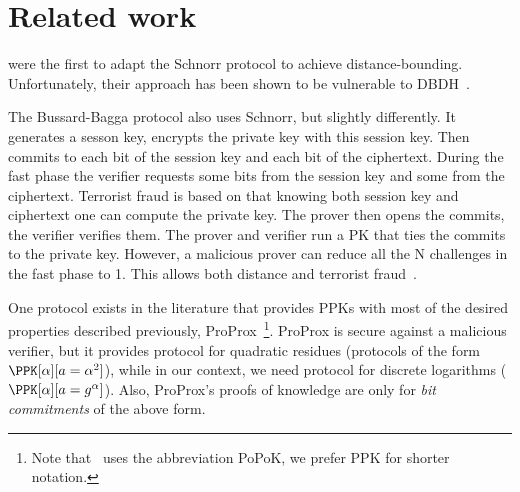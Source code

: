 \section{Related work}%
\label{related-work}

\textcite{DistanceBounding} were the first to adapt the Schnorr
protocol to achieve distance-bounding.
Unfortunately, their approach has been shown to be vulnerable to 
\ac{DBDH}~\cite[\eg][]{TamarinDB}.

The Bussard-Bagga protocol also uses Schnorr, but slightly
differently. It generates a sesson key, encrypts the private key
with this session key. Then commits to each bit of the session key
and each bit of the ciphertext. During the fast phase the verifier requests some bits from the session key and some from the ciphertext. Terrorist fraud is based on that knowing both session key and ciphertext one can compute the private key.
The prover then opens the commits, the verifier verifies them.
The prover and verifier run a PK that ties the commits to the private key.
However, a malicious prover can reduce all the N challenges in the fast phase
to 1. This allows both distance and terrorist
fraud~\cite{Bussard-Bagga-attack}.

One protocol exists in the literature that provides \acp{PPK} with most of the desired properties described previously, ProProx~\cite{ProProx}\footnote{Note that~\cite{ProProx} uses the abbreviation PoPoK, we prefer \acs{PPK} for shorter notation.}.
ProProx is secure against a malicious verifier, but it provides  
protocol for quadratic residues (\ie protocols of the form \(
  \PPK[\alpha][a = \alpha^2]
\)), while in our context, we need  protocol for discrete logarithms 
(\ie \(\PPK[\alpha][a = g^\alpha]\)).
Also, ProProx's proofs of knowledge are only for \emph{bit commitments} of the 
above form.


